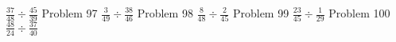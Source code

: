 \documentclass{article}
\begin{document}
\hfill \break
$\displaystyle \frac{37}{48} \div \frac{45}{39}$
\newline
\hfill \break
Problem 97
\newline
\hfill \break
$\displaystyle \frac{3}{49} \div \frac{38}{46}$
\newline
\hfill \break
Problem 98
\newline
\hfill \break
$\displaystyle \frac{8}{48} \div \frac{2}{45}$
\newline
\hfill \break
Problem 99
\newline
\hfill \break
$\displaystyle \frac{23}{45} \div \frac{1}{29}$
\newline
\hfill \break
Problem 100
\newline
\hfill \break
$\displaystyle \frac{48}{24} \div \frac{37}{40}$
\newline
\hfill \break
\end{document}
